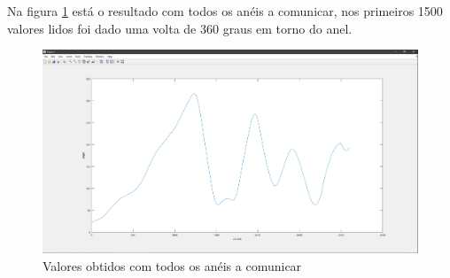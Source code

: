 Na figura \ref{todos} está o resultado com todos os anéis a comunicar, nos primeiros 1500 valores lidos foi dado uma volta de 360 graus em torno do anel.
\begin{figure}[!htb]
\centering
\includegraphics[scale=0.18]{Figuras/res_todos.png}
\caption{Valores obtidos com todos os anéis a comunicar}
\label{todos}
\end{figure}





